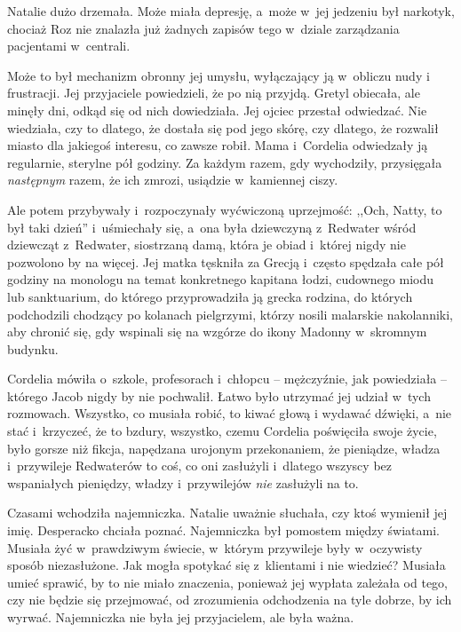 \documentclass[oneside,polish,11pt,sfheadings]{mwbk}
\begin{document}
Natalie dużo drzemała. Może miała depresję, a~może w~jej jedzeniu był
narkotyk, chociaż Roz nie znalazła już żadnych zapisów tego w~dziale
zarządzania pacjentami w~centrali.

Może to był mechanizm obronny jej umysłu, wyłączający ją w~obliczu nudy
i frustracji. Jej przyjaciele powiedzieli, że po nią przyjdą. Gretyl
obiecała, ale minęły dni, odkąd się od nich dowiedziała. Jej ojciec
przestał odwiedzać. Nie wiedziała, czy to dlatego, że dostała się pod
jego skórę, czy dlatego, że rozwalił miasto dla jakiegoś interesu, co
zawsze robił. Mama i~Cordelia odwiedzały ją regularnie, sterylne pół
godziny. Za każdym razem, gdy wychodziły, przysięgała \textit{następnym}
razem, że ich zmrozi, usiądzie w~kamiennej ciszy.

Ale potem przybywały i~rozpoczynały wyćwiczoną uprzejmość: ,,Och, Natty,
to był taki dzień'' i~uśmiechały się, a~ona była dziewczyną z~Redwater
wśród dziewcząt z~Redwater, siostrzaną damą, która je obiad i~której
nigdy nie pozwolono by na więcej. Jej matka tęskniła za Grecją i~często
spędzała całe pół godziny na monologu na temat konkretnego kapitana
łodzi, cudownego miodu lub sanktuarium, do którego przyprowadziła ją
grecka rodzina, do których podchodzili chodzący po kolanach pielgrzymi,
którzy nosili malarskie nakolanniki, aby chronić się, gdy wspinali się
na wzgórze do ikony Madonny w~skromnym budynku.

Cordelia mówiła o~szkole, profesorach i~chłopcu -- mężczyźnie, jak
powiedziała -- którego Jacob nigdy by nie pochwalił. Łatwo było utrzymać
jej udział w~tych rozmowach. Wszystko, co musiała robić, to kiwać głową
i wydawać dźwięki, a~nie stać i~krzyczeć, że to bzdury, wszystko, czemu
Cordelia poświęciła swoje życie, było gorsze niż fikcja, napędzana
urojonym przekonaniem, że pieniądze, władza i~przywileje Redwaterów to
coś, co oni zasłużyli i~dlatego wszyscy bez wspaniałych pieniędzy,
władzy i~przywilejów \textit{nie} zasłużyli na to.

Czasami wchodziła najemniczka. Natalie uważnie słuchała, czy ktoś
wymienił jej imię. Desperacko chciała poznać. Najemniczka był pomostem
między światami. Musiała żyć w~prawdziwym świecie, w~którym przywileje
były w~oczywisty sposób niezasłużone. Jak mogła spotykać się z~klientami
i nie wiedzieć? Musiała umieć sprawić, by to nie miało znaczenia,
ponieważ jej wypłata zależała od tego, czy nie będzie się przejmować, od
zrozumienia odchodzenia na tyle dobrze, by ich wyrwać. Najemniczka nie
była jej przyjacielem, ale była ważna.
\end{document}
